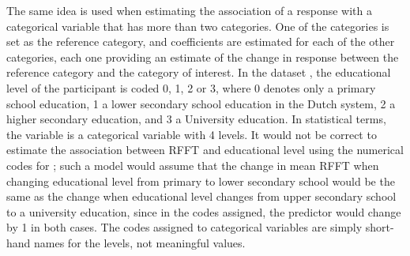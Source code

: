 The same idea is used when estimating the association of a response with a categorical variable that has more than two categories.  One of the categories is set as the reference category, and coefficients are estimated for each of the other categories, each one providing an estimate of the change in response between the reference category and the category of interest.  In the dataset , the educational level of the participant is coded 0, 1, 2 or 3, where 0 denotes only a primary school education, 1 a lower secondary school education in the Dutch system, 2 a higher secondary education, and 3 a University education.   In statistical terms, the variable  is a categorical variable with 4 levels.  It would not be correct to estimate the association between RFFT and educational level using the numerical codes for ; such a model would assume that the change in mean RFFT when changing educational level from primary to lower secondary school would be the same as the change when educational level changes from upper secondary school to a university education, since in the codes assigned, the predictor would change by 1 in both cases.  The codes assigned to categorical variables are simply short-hand names for the levels, not meaningful values.  

